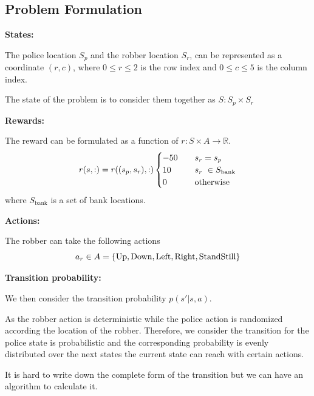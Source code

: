 \documentclass{article}
\begin{document}
\subsection{Problem Formulation}
\textbf{States:}

The police location $S_p$ and the robber location $S_r$, can be represented
as a coordinate $(r, c)$,
where $0 \leq r \leq 2$ is the row index and $0 \leq c \leq 5$ is the column index.

The state of the problem is to consider them together as $S: S_p \times S_r$

\textbf{Rewards:}

The reward can be formulated as a function of $r: S\times A\rightarrow \mathbb{R}$.
\begin{equation*}
  r(s, :) = r((s_p, s_r), :)
  \begin{cases}
    -50  \quad & s_r = s_p \\
    10   \quad & s_r ~ \in S_{\text{bank}}\\
    0    \quad &\textup{otherwise}
  \end{cases}
\end{equation*}
where $S_{\text{bank}}$ is a set of bank locations.

\textbf{Actions:}

The robber can take the following actions
\begin{equation*}
  a_r \in A = \{\textup{Up},\textup{Down},\textup{Left},\textup{Right},\textup{StandStill}\}
\end{equation*}

\textbf{Transition probability:}

We then consider the transition probability $p(s' | s, a)$.

As the robber action is deterministic while the police action is randomized
according the location of the robber.
Therefore, we consider the transition for the police state is probabilistic and
the corresponding probability is evenly distributed over the next states the current
state can reach with certain actions.

It is hard to write down the complete form of the transition but we can have an
algorithm to calculate it.
\end{document}

